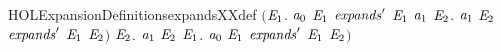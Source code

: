 \begin{SaveVerbatim}{HOLExpansionDefinitionsexpandsXXdef}
                \ensuremath{(}\HOLSymConst{\HOLTokenForall{}}\ensuremath{\HOLBoundVar{E}\sb{\mathrm{1}}}.
                     \ensuremath{\HOLBoundVar{a}\sb{\mathrm{0}}} \HOLTokenTransBegin\HOLConst{\ensuremath{\tau}}\HOLTokenTransEnd \ensuremath{\HOLBoundVar{E}\sb{\mathrm{1}}} \HOLSymConst{\HOLTokenImp{}}
                     \ensuremath{\HOLBoundVar{expands}\sp{\prime}} \ensuremath{\HOLBoundVar{E}\sb{\mathrm{1}}} \ensuremath{\HOLBoundVar{a}\sb{\mathrm{1}}} \HOLSymConst{\HOLTokenDisj{}}
                     \HOLSymConst{\HOLTokenExists{}}\ensuremath{\HOLBoundVar{E}\sb{\mathrm{2}}}. \ensuremath{\HOLBoundVar{a}\sb{\mathrm{1}}} \HOLTokenTransBegin\HOLConst{\ensuremath{\tau}}\HOLTokenTransEnd \ensuremath{\HOLBoundVar{E}\sb{\mathrm{2}}} \HOLSymConst{\HOLTokenConj{}} \ensuremath{\HOLBoundVar{expands}\sp{\prime}} \ensuremath{\HOLBoundVar{E}\sb{\mathrm{1}}} \ensuremath{\HOLBoundVar{E}\sb{\mathrm{2}}}\ensuremath{)} \HOLSymConst{\HOLTokenConj{}}
                \HOLSymConst{\HOLTokenForall{}}\ensuremath{\HOLBoundVar{E}\sb{\mathrm{2}}}. \ensuremath{\HOLBoundVar{a}\sb{\mathrm{1}}} \HOLTokenTransBegin\HOLConst{\ensuremath{\tau}}\HOLTokenTransEnd \ensuremath{\HOLBoundVar{E}\sb{\mathrm{2}}} \HOLSymConst{\HOLTokenImp{}} \HOLSymConst{\HOLTokenExists{}}\ensuremath{\HOLBoundVar{E}\sb{\mathrm{1}}}. \ensuremath{\HOLBoundVar{a}\sb{\mathrm{0}}} \HOLTokenWeakTransBegin\HOLConst{\ensuremath{\tau}}\HOLTokenWeakTransEnd \ensuremath{\HOLBoundVar{E}\sb{\mathrm{1}}} \HOLSymConst{\HOLTokenConj{}} \ensuremath{\HOLBoundVar{expands}\sp{\prime}} \ensuremath{\HOLBoundVar{E}\sb{\mathrm{1}}} \ensuremath{\HOLBoundVar{E}\sb{\mathrm{2}}}\ensuremath{)}
\end{SaveVerbatim}
\newcommand{\HOLExpansionDefinitionsexpandsXXdef}{\UseVerbatim{HOLExpansionDefinitionsexpandsXXdef}}
